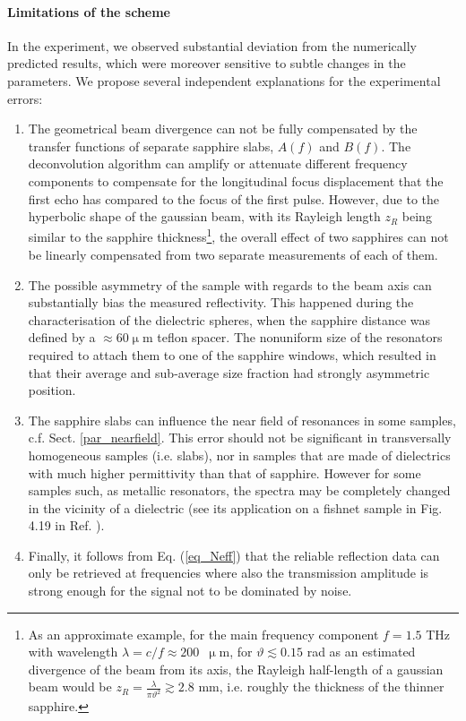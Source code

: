 \paragraph{Limitations of the scheme} %
In the experiment, we observed substantial deviation  %
from the numerically predicted results, which were moreover sensitive to subtle changes in the parameters. We propose  several independent explanations for the experimental errors:
\begin{enumerate}
\item{The geometrical beam divergence can not be fully compensated by the transfer functions of separate sapphire slabs, $A(f)$ and $B(f)$. The deconvolution algorithm can amplify or attenuate different frequency components to compensate for the  longitudinal focus displacement that the first echo has compared to the focus of the first pulse. However, due to the hyperbolic shape of the gaussian beam, with its Rayleigh length $z_{R}$ being similar to the sapphire thickness\footnote{As an approximate example, for the main frequency component $f = 1.5$ THz with wavelength $\lambda = c / f \approx 200$~$\upmu$m, for $\vartheta \lesssim 0.15$ rad as an estimated divergence of the beam from its axis, the Rayleigh half-length of a gaussian beam would be $z_{R} = \frac{\lambda}{\pi \vartheta^{2}} \gtrsim 2.8$ mm, i.e. roughly the thickness of the thinner sapphire.}, the overall effect of two sapphires can not be linearly compensated from two separate measurements of each of them.} 
 \item{The possible asymmetry of the sample with regards to the beam axis can substantially bias the measured reflectivity. This happened during the characterisation of the dielectric spheres, when the sapphire distance was defined by a $\approx$60$\upmu$m teflon spacer. The nonuniform size of the resonators required to attach them to one of the sapphire windows, which resulted in that their average and sub-average size fraction had strongly asymmetric position. } 
 \item{The sapphire slabs can influence the near field of resonances in some samples, c.f. Sect. \ref{par_nearfield}. This error should not be significant in transversally homogeneous samples (i.e. slabs), nor in samples that are made of dielectrics with much higher permittivity than that of sapphire. However for some samples such, as metallic resonators, the spectra may be completely changed in the vicinity of a dielectric (see its application on a fishnet sample in Fig. 4.19 in Ref. \cite{yahiaoui2011phd}). }
 \item{Finally, it follows from Eq. (\ref{eq_Neff})
 that the reliable reflection data can only be retrieved at frequencies where also the transmission amplitude is strong enough for the signal not to be dominated by noise. }
 \end{enumerate}
\label{srtm2}

